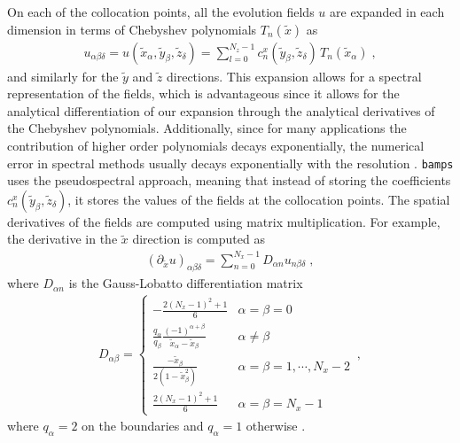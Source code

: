 On each of the collocation points, all the evolution fields $u$ are expanded in each dimension in terms of Chebyshev polynomials $T_n(\tilde{x})$ as
%
\begin{align}
    u_{\alpha \beta \delta} = u(\tilde{x}_\alpha, \tilde{y}_\beta, \tilde{z}_\delta) = \sum_{l=0}^{N_z -1} c^x_n(\tilde{y}_\beta, \tilde{z}_\delta) \, T_n(\tilde{x}_\alpha) \; ,
\end{align}
%
and similarly for the $\tilde{y}$ and $\tilde{z}$ directions. This expansion allows for a spectral representation of the fields, which is advantageous since it allows for the analytical differentiation of our expansion through the analytical derivatives of the Chebyshev polynomials. Additionally, since for many applications the contribution of higher order polynomials decays exponentially, the numerical error in spectral methods usually decays exponentially with the resolution \cite{Numerical_Relativity_Solving_Einsteins_Equations_on_the_Computer}. \texttt{bamps} uses the pseudospectral approach, meaning that instead of storing the coefficients $c^x_n(\tilde{y}_\beta, \tilde{z}_\delta)$, it stores the values of the fields at the collocation points. The spatial derivatives of the fields are computed using matrix multiplication. For example, the derivative in the $\tilde{x}$ direction is computed as
%
\begin{align}
    (\partial_{\tilde{x}} u)_{\alpha \beta \delta} = \sum_{n=0}^{N_x -1} D_{\alpha n} u_{n \beta \delta} \; ,
\end{align}
%
where $D_{\alpha n}$ is the Gauss-Lobatto differentiation matrix
%
\begin{align}
    D_{\alpha\beta}=
    \begin{cases}
    -\frac{2(N_x-1)^2+1}{6} & \alpha=\beta=0 \\
    \frac{q_\alpha}{q_\beta}\frac{(-1)^{\alpha+\beta}}{\tilde{x}_\alpha-\tilde{x}_\beta} & \alpha\neq\beta \\
    \frac{-\tilde{x}_\beta}{2(1-\tilde{x}_\beta^2)} & \alpha=\beta=1,\cdots,N_x-2 \\
    \frac{2(N_x-1)^2+1}{6} & \alpha=\beta=N_x-1
    \end{cases} \, ,
\end{align}
%
where $q_\alpha = 2$ on the boundaries and $q_\alpha = 1$ otherwise \cite{Pseudospectral_method_for_gravitational_wave_collapse,Numerical_Relativity_Solving_Einsteins_Equations_on_the_Computer}.


